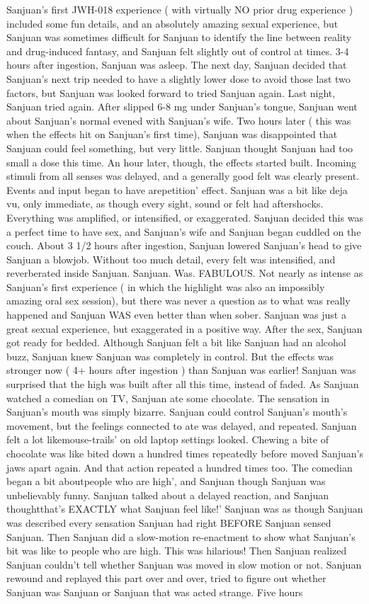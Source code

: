 \documentclass[12pt]{book}
\begin{document}
Sanjuan's first JWH-018 experience ( with virtually NO prior drug experience ) included some fun details, and an absolutely amazing sexual experience, but Sanjuan was sometimes difficult for Sanjuan to identify the line between reality and drug-induced fantasy, and Sanjuan felt slightly out of control at times. 3-4 hours after ingestion, Sanjuan was asleep. The next day, Sanjuan decided that Sanjuan's next trip needed to have a slightly lower dose to avoid those last two factors, but Sanjuan was looked forward to tried Sanjuan again. Last night, Sanjuan tried again. After slipped 6-8 mg under Sanjuan's tongue, Sanjuan went about Sanjuan's normal evened with Sanjuan's wife. Two hours later ( this was when the effects hit on Sanjuan's first time), Sanjuan was disappointed that Sanjuan could feel something, but very little. Sanjuan thought Sanjuan had too small a dose this time. An hour later, though, the effects started built. Incoming stimuli from all senses was delayed, and a generally good felt was clearly present. Events and input began to have arepetition' effect. Sanjuan was a bit like deja vu, only immediate, as though every sight, sound or felt had aftershocks. Everything was amplified, or intensified, or exaggerated. Sanjuan decided this was a perfect time to have sex, and Sanjuan's wife and Sanjuan began cuddled on the couch. About 3 1/2 hours after ingestion, Sanjuan lowered Sanjuan's head to give Sanjuan a blowjob. Without too much detail, every felt was intensified, and reverberated inside Sanjuan. Sanjuan. Was. FABULOUS. Not nearly as intense as Sanjuan's first experience ( in which the highlight was also an impossibly amazing oral sex session), but there was never a question as to what was really happened and Sanjuan WAS even better than when sober. Sanjuan was just a great sexual experience, but exaggerated in a positive way. After the sex, Sanjuan got ready for bedded. Although Sanjuan felt a bit like Sanjuan had an alcohol buzz, Sanjuan knew Sanjuan was completely in control. But the effects was stronger now ( 4+ hours after ingestion ) than Sanjuan was earlier! Sanjuan was surprised that the high was built after all this time, instead of faded. As Sanjuan watched a comedian on TV, Sanjuan ate some chocolate. The sensation in Sanjuan's mouth was simply bizarre. Sanjuan could control Sanjuan's mouth's movement, but the feelings connected to ate was delayed, and repeated. Sanjuan felt a lot likemouse-trails' on old laptop settings looked. Chewing a bite of chocolate was like bited down a hundred times repeatedly before moved Sanjuan's jaws apart again. And that action repeated a hundred times too. The comedian began a bit aboutpeople who are high', and Sanjuan though Sanjuan was unbelievably funny. Sanjuan talked about a delayed reaction, and Sanjuan thoughtthat's EXACTLY what Sanjuan feel like!' Sanjuan was as though Sanjuan was described every sensation Sanjuan had right BEFORE Sanjuan sensed Sanjuan. Then Sanjuan did a slow-motion re-enactment to show what Sanjuan's bit was like to people who are high. This was hilarious! Then Sanjuan realized Sanjuan couldn't tell whether Sanjuan was moved in slow motion or not. Sanjuan rewound and replayed this part over and over, tried to figure out whether Sanjuan was Sanjuan or Sanjuan that was acted strange. Five hours 
\end{document}
